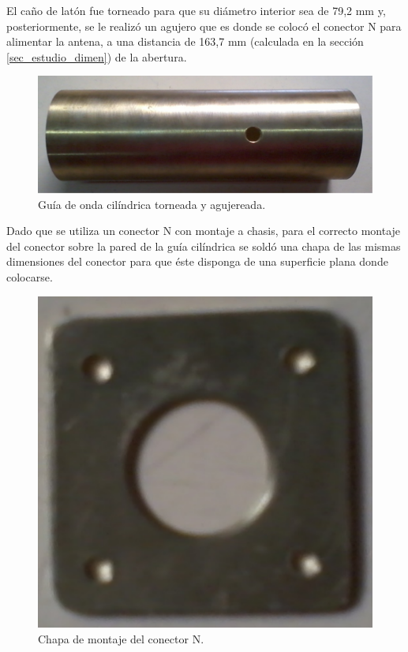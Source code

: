 El caño de latón fue torneado para que su diámetro interior sea de 79,2 mm y, posteriormente, se le realizó un agujero que es donde se colocó el conector N para alimentar la antena, a una distancia de 163,7 mm (calculada en la sección \ref{sec_estudio_dimen}) de la abertura.
\begin{figure}[H]
\centering
\includegraphics[scale = 0.25]{Figures/Resultados/resultados_3}
\caption{Guía de onda cilíndrica torneada y agujereada.}
\label{fig_resultados:3}
\end{figure}
Dado que se utiliza un conector N con montaje a chasis, para el correcto montaje del conector sobre la pared de la guía cilíndrica se soldó una chapa de las mismas dimensiones del conector para que éste disponga de una superficie plana donde colocarse.
\begin{figure} [H]
\centering 
\includegraphics[scale = 0.2]{Figures/Resultados/resultados_4}
\caption{Chapa de montaje del conector N.}
\label{fig_resultados:4}
\end{figure}
